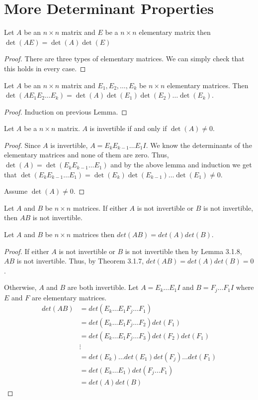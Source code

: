 \section{More Determinant Properties}
\begin{lemma}
    Let $A$ be an $n\times n$ matrix and $E$ be a $n\times n$ elementary matrix then $\det(AE)=\det(A)\det(E)$
\end{lemma}
\begin{proof}
    There are three types of elementary matrices. We can simply check that this holds in every case.
\end{proof}
\begin{theorem}
    Let $A$ be an $n\times n$ matrix and $E_1,E_2,\dots, E_k$ be $n\times n$ elementary matrices. Then $\det(AE_1E_2\dots E_k)=\det(A)\det(E_1)\det(E_2)\dots\det(E_k)$.
\end{theorem}
\begin{proof}
    Induction on previous Lemma.
\end{proof}
\begin{theorem}
    Let $A$ be a $n\times n$ matrix. $A$ is invertible if and only if $\det(A)\neq 0$.
\end{theorem}
\begin{proof}
    Since $A$ is invertible, $A=E_kE_{k-1}\ldots E_1 I$. We know the determinants of the elementary matrices and none of them are zero. Thus, $\det(A)=\det(E_k E_{k-1}\ldots E_1)$ and by the above lemma and induction we get that $\det(E_k E_{k-1}\ldots E_1)=\det(E_k)\det(E_{k-1})\ldots \det(E_1)\neq 0$.

    Assume $\det(A)\neq 0$.
\end{proof}
\begin{lemma}
    Let $A$ and $B$ be $n\times n$ matrices. If either $A$ is not invertible or $B$ is not invertible, then $AB$ is not invertible.
\end{lemma}
\begin{theorem}
    Let $A$ and $B$ be $n\times n$ matrices then $det(AB)=det(A)det(B)$.
\end{theorem}
\begin{proof}
    If either $A$ is not invertible or $B$ is not invertible then by Lemma 3.1.8, $AB$ is not invertible. Thus, by Theorem 3.1.7, $det(AB)=det(A)det(B)=0$.

    Otherwise, $A$ and $B$ are both invertible. Let $A=E_k\ldots E_1I$ and $B=F_j\ldots F_1I$ where $E$ and $F$ are elementary matrices.
    \begin{align*}
        det(AB)&=det(E_k\ldots E_1 F_j\ldots F_1)\\
        &=det(E_k\ldots E_1F_j\ldots F_2)det(F_1)\tag{by Lemma 18.6}\\
        &=det(E_k\ldots E_1F_j\ldots F_3)det(F_2)det(F_1)\tag{by Lemma 18.6}\\
        &\vdots\\
        &=det(E_k)\ldots det(E_1)det(F_j)\ldots det(F_1)\\
        &=det(E_k\ldots E_1)det(F_j\ldots F_1)\\
        &=det(A)det(B)
    \end{align*}
\end{proof}
